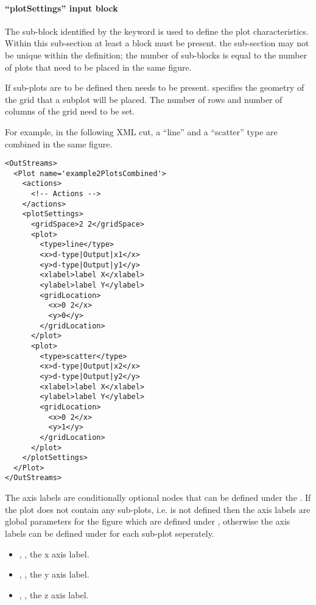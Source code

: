 \paragraph{``plotSettings'' input block \label{sec:plotSettings}}

The sub-block identified by the keyword  is used to
define the plot characteristics.
%
Within this sub-section at least a  block must be present.
%
the  sub-section may not be unique within the
 definition; the number of  sub-blocks is
equal to the number of plots that need to be placed in the same figure.
%

If sub-plots are to be defined then  needs to be present.
 specifies the geometry of the grid that a subplot will be placed.
The number of rows and number of columns of the grid need to be set.
%

For example, in the following XML cut, a ``line'' and a ``scatter'' type are
combined in the same figure.
%
\begin{lstlisting}[style=XML,morekeywords={name},deletekeywords={type}]
<OutStreams>
  <Plot name='example2PlotsCombined'>
    <actions>
      <!-- Actions -->
    </actions>
    <plotSettings>
      <gridSpace>2 2</gridSpace>
      <plot>
        <type>line</type>
        <x>d-type|Output|x1</x>
        <y>d-type|Output|y1</y>
        <xlabel>label X</xlabel>
        <ylabel>label Y</ylabel>
        <gridLocation>
          <x>0 2</x>
          <y>0</y>
        </gridLocation>
      </plot>
      <plot>
        <type>scatter</type>
        <x>d-type|Output|x2</x>
        <y>d-type|Output|y2</y>
        <xlabel>label X</xlabel>
        <ylabel>label Y</ylabel>
        <gridLocation>
          <x>0 2</x>
          <y>1</y>
        </gridLocation>
      </plot>
    </plotSettings>
  </Plot>
</OutStreams>
\end{lstlisting}

The axis labels  are conditionally optional nodes
that can be defined under the . If the plot does not contain any sub-plots,
i.e.  is not defined then the axis labels are global parameters for the figure
which are defined under , otherwise the axis labels can be defined under 
for each sub-plot seperately.
\begin{itemize}
  \item {}, , the x axis
  label.
  \item {}, , the y axis
  label.
  \item {}, ,
  the z axis label.
\end{itemize}
%


